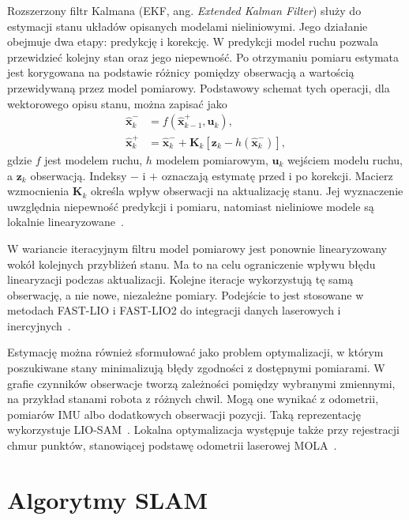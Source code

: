 \documentclass[a4paper,twoside,12pt]{book}
\begin{document}
Rozszerzony filtr Kalmana (EKF, ang. \textit{Extended Kalman Filter}) służy do estymacji stanu układów opisanych modelami nieliniowymi. Jego działanie obejmuje dwa etapy: predykcję i korekcję. W predykcji model ruchu pozwala przewidzieć kolejny stan oraz jego niepewność. Po otrzymaniu pomiaru estymata jest korygowana na podstawie różnicy pomiędzy obserwacją a wartością przewidywaną przez model pomiarowy. Podstawowy schemat tych operacji, dla wektorowego opisu stanu, można zapisać jako
\begin{align}
    \widehat{\mathbf{x}}_k^{-}
    &= f\!\left(\widehat{\mathbf{x}}_{k-1}^{+},\mathbf{u}_k\right),
    \label{eq:zalazek_ekf_predykcja}\\
    \widehat{\mathbf{x}}_k^{+}
    &= \widehat{\mathbf{x}}_k^{-}
    +\mathbf{K}_k\left[
    \mathbf{z}_k-h\!\left(\widehat{\mathbf{x}}_k^{-}\right)\right],
    \label{eq:zalazek_ekf_korekcja}
\end{align}
gdzie $f$ jest modelem ruchu, $h$ modelem pomiarowym, $\mathbf{u}_k$ wejściem modelu ruchu, a $\mathbf{z}_k$ obserwacją. Indeksy $-$ i $+$ oznaczają estymatę przed i po korekcji. Macierz wzmocnienia $\mathbf{K}_k$ określa wpływ obserwacji na aktualizację stanu. Jej wyznaczenie uwzględnia niepewność predykcji i pomiaru, natomiast nieliniowe modele są lokalnie linearyzowane~\cite{rb3_welch2006}.

W wariancie iteracyjnym filtru model pomiarowy jest ponownie linearyzowany wokół kolejnych przybliżeń stanu. Ma to na celu ograniczenie wpływu błędu linearyzacji podczas aktualizacji. Kolejne iteracje wykorzystują tę samą obserwację, a nie nowe, niezależne pomiary. Podejście to jest stosowane w metodach FAST-LIO i FAST-LIO2 do integracji danych laserowych i inercyjnych~\cite{Xu2020FASTLIOAF,lidar_inertial_odometry_tight_coupled}.

Estymację można również sformułować jako problem optymalizacji, w którym poszukiwane stany minimalizują błędy zgodności z dostępnymi pomiarami. W grafie czynników obserwacje tworzą zależności pomiędzy wybranymi zmiennymi, na przykład stanami robota z różnych chwil. Mogą one wynikać z odometrii, pomiarów IMU albo dodatkowych obserwacji pozycji. Taką reprezentację wykorzystuje LIO-SAM~\cite{9341176}. Lokalna optymalizacja występuje także przy rejestracji chmur punktów, stanowiącej podstawę odometrii laserowej MOLA~\cite{blanco2025mola_lo}.

\section{Algorytmy SLAM}
\end{document}

